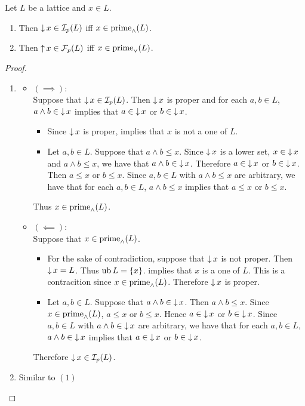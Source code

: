 \documentclass{book}
\begin{document}
	\begin{ex}
		Let $L$ be a lattice and $x \in L$.
		\begin{enumerate}
			\item Then $\operatorname{\downarrow} x \in \mathcal{I}_p(L)$ iff $x \in \operatorname*{\text{prime}_{\wedge}}(L)$.
			\item Then $\operatorname{\uparrow} x \in \mathcal{F}_p(L)$ iff $x \in \operatorname*{\text{prime}_{\vee}}(L)$.
		\end{enumerate}
	\end{ex}
	
	\begin{proof}\
		\begin{enumerate}
			\item 
			\begin{itemize}
				\item $(\implies)$: \\
				Suppose that $\operatorname{\downarrow} x \in \mathcal{I}_p(L)$. Then $\operatorname{\downarrow} x$ is proper and for each $a,b \in L$, $a \wedge b \in \operatorname{\downarrow} x$ implies that $a \in \operatorname{\downarrow} x$ or $b \in \operatorname{\downarrow} x$. 
				\begin{itemize}
					\item Since $\operatorname{\downarrow} x$ is proper,  implies that $x$ is not a one of $L$. 
					\item Let $a,b \in L$. Suppose that $a \wedge b \leq x$. Since $\operatorname{\downarrow} x$ is a lower set, $x \in \operatorname{\downarrow} x$ and $a \wedge b \leq x$, we have that $a \wedge b \in \operatorname{\downarrow} x$. Therefore $a \in \operatorname{\downarrow} x$ or $b \in \operatorname{\downarrow} x$. Then $a \leq x$ or $b \leq x$. Since $a,b \in L$ with $a \wedge b \leq x$ are arbitrary, we have that for each $a, b \in L$, $a \wedge b \leq x$ implies that $a \leq x$ or $b \leq x$. 
				\end{itemize}
				Thus $x \in \operatorname*{\text{prime}_{\wedge}}(L)$.
				\item $(\impliedby)$: \\
				Suppose that $x \in \operatorname*{\text{prime}_{\wedge}}(L)$.
				\begin{itemize}
					\item For the sake of contradiction, suppose that $\operatorname{\downarrow} x$ is not proper. Then $\operatorname{\downarrow} x = L$. Thus $\operatorname{ub} L = \{x\}$.  implies that $x$ is a one of $L$. This is a contracition since $x \in \operatorname*{\text{prime}_{\wedge}}(L)$. Therefore $\operatorname{\downarrow} x$ is proper. 
					\item Let $a,b \in L$. Suppose that $a \wedge b \in \operatorname{\downarrow} x$. Then $a \wedge b \leq x$. Since $x \in \operatorname*{\text{prime}_{\wedge}}(L)$, $a \leq x$ or $b \leq x$. Hence $a \in \operatorname{\downarrow} x$ or $b \in \operatorname{\downarrow} x$. Since $a,b \in L$ with $a \wedge b \in \operatorname{\downarrow} x$ are arbitrary, we have that for each $a,b \in L$, $a \wedge b \in \operatorname{\downarrow} x$ implies that $a \in \operatorname{\downarrow} x$ or $b \in \operatorname{\downarrow} x$.
				\end{itemize}
				Therefore $\operatorname{\downarrow} x \in \mathcal{I}_p(L)$.
			\end{itemize}
			\item Similar to $(1)$ 
		\end{enumerate}
	\end{proof}
	
\end{document}
